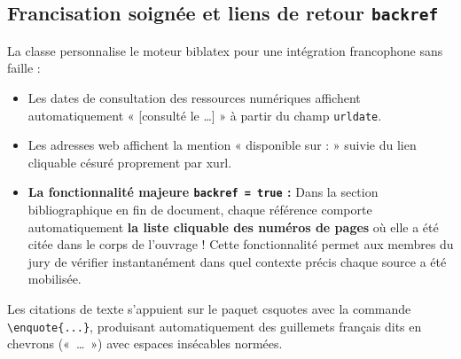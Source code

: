 \subsection{Francisation soignée et liens de retour \texttt{backref}}
\label{subsec:francisation_backref}

La classe personnalise le moteur \textsf{biblatex} pour une intégration francophone sans faille :
\begin{itemize}
  \item Les dates de consultation des ressources numériques affichent automatiquement « [consulté le \dots] » à partir du champ \texttt{urldate}.
  \item Les adresses web affichent la mention « disponible sur : » suivie du lien cliquable césuré proprement par \textsf{xurl}.
  \item \textbf{La fonctionnalité majeure \texttt{backref = true} :}
  Dans la section bibliographique en fin de document, chaque référence comporte automatiquement \textbf{la liste cliquable des numéros de pages} où elle a été citée dans le corps de l'ouvrage !
  Cette fonctionnalité permet aux membres du jury de vérifier instantanément dans quel contexte précis chaque source a été mobilisée.
\end{itemize}

Les citations de texte s'appuient sur le paquet \textsf{csquotes} avec la commande \texttt{\textbackslash enquote\{...\}}, produisant automatiquement des guillemets français dits en chevrons («~\dots~») avec espaces insécables normées.


